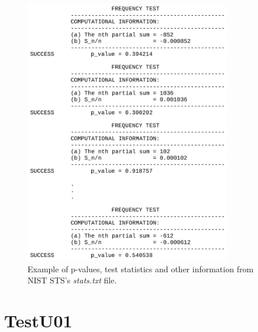 \documentclass[
  digital,     %
  oneside,     %
  nosansbold,  %
  nocolorbold, %
  nolof,         %
  nolot,         %
]{fithesis4}
\begin{document}
\begin{figure}[h]
  \begin{center}
    \includegraphics[width=9cm]{figures/outputs-appendix/stats.jpg}
  \end{center}
  \caption{Example of p-values, test statistics and other information from NIST STS's \emph{stats.txt} file.}
  \label{fig:nist_stats}
\end{figure}

\newpage

\section{TestU01} \label{append:tu01-output}
\end{document}

